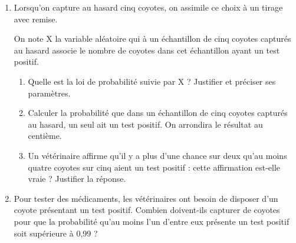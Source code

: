 \begin{enumerate}
	\item Lorsqu'on capture au hasard cinq coyotes, on assimile ce choix à un tirage avec remise.
	
	On note X la variable aléatoire qui à un échantillon de cinq coyotes capturés au hasard associe le nombre de coyotes dans cet échantillon ayant un test positif.
	\begin{enumerate}
		\item Quelle est la loi de probabilité suivie par X ? Justifier et préciser ses paramètres.
		\item Calculer la probabilité que dans un échantillon de cinq coyotes capturés au hasard, un seul ait un test positif. On arrondira le résultat au centième.
		\item Un vétérinaire affirme qu’il y a plus d’une chance sur deux qu’au moins quatre coyotes sur  cinq aient un test positif : cette affirmation est-elle vraie ? Justifier la réponse.
	\end{enumerate}
	\item Pour tester des médicaments, les vétérinaires ont besoin de disposer d’un coyote présentant un test positif. Combien doivent-ils capturer de coyotes pour que la probabilité qu’au moins l’un d’entre eux présente un test positif soit supérieure à 0,99 ?
\end{enumerate}

